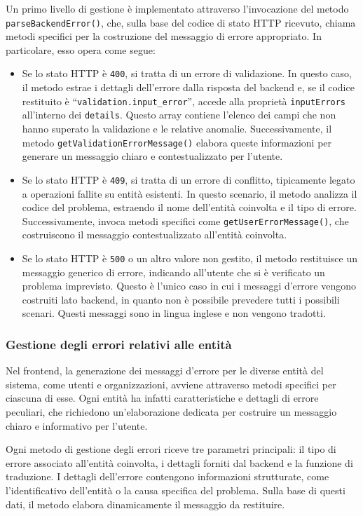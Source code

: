 Un primo livello di gestione è implementato attraverso l'invocazione del metodo \texttt{parseBackendError()}, che, sulla base del codice di stato HTTP ricevuto, chiama metodi specifici per la costruzione del messaggio di errore appropriato. In particolare, esso opera come segue:
\begin{itemize}
  \item Se lo stato HTTP è \texttt{400}, si tratta di un errore di validazione. In questo caso, il metodo estrae i dettagli dell'errore dalla risposta del backend e, se il codice restituito è ``\texttt{validation.input\_error}'', accede alla proprietà \texttt{inputErrors} all'interno dei \texttt{details}. Questo array contiene l’elenco dei campi che non hanno superato la validazione e le relative anomalie. Successivamente, il metodo \texttt{getValidationErrorMessage()} elabora queste informazioni per generare un messaggio chiaro e contestualizzato per l’utente.
  \item Se lo stato HTTP è \texttt{409}, si tratta di un errore di conflitto, tipicamente legato a operazioni fallite su entità esistenti. In questo scenario, il metodo analizza il codice del problema, estraendo il nome dell’entità coinvolta e il tipo di errore. Successivamente, invoca metodi specifici come \texttt{getUserErrorMessage()}, che costruiscono il messaggio contestualizzato all'entità coinvolta.
  \item Se lo stato HTTP è \texttt{500} o un altro valore non gestito, il metodo restituisce un messaggio generico di errore, indicando all’utente che si è verificato un problema imprevisto. Questo è l'unico caso in cui i messaggi d'errore vengono costruiti lato backend, in quanto non è possibile prevedere tutti i possibili scenari. Questi messaggi sono in lingua inglese e non vengono tradotti.
\end{itemize}

\subsubsection{Gestione degli errori relativi alle entità}
Nel frontend, la generazione dei messaggi d'errore per le diverse entità del sistema, come utenti e organizzazioni, avviene attraverso metodi specifici per ciascuna di esse. Ogni entità ha infatti caratteristiche e dettagli di errore peculiari, che richiedono un'elaborazione dedicata per costruire un messaggio chiaro e informativo per l'utente.

Ogni metodo di gestione degli errori riceve tre parametri principali: il tipo di errore associato all'entità coinvolta, i dettagli forniti dal backend e la funzione di traduzione. I dettagli dell’errore contengono informazioni strutturate, come l’identificativo dell’entità o la causa specifica del problema. Sulla base di questi dati, il metodo elabora dinamicamente il messaggio da restituire.

